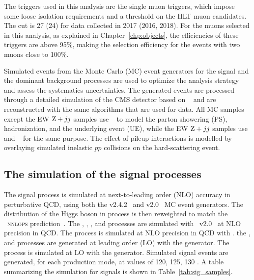 The triggers used in this analysis are the single muon triggers, which impose some loose isolation requirements and a \pt threshold on the HLT muon candidates.
The \pt cut is 27 (24) \GeV for data collected in 2017 (2016, 2018). 
For the muons selected in this analysis, as explained in Chapter~\ref{chp:objects}, the efficiencies of these triggers are above 95\%, 
making the selection efficiency for the events with two muons close to 100\%.

Simulated events from the Monte Carlo (MC) event generators for the signal and the dominant background processes are used to 
optimize the analysis strategy and assess the systematics uncertainties.
The generated events are processed through a detailed simulation of the CMS detector based on \GEANTfour~\cite{AGOSTINELLI2003250}
and are reconstructed with the same algorithms that are used for data.
All MC samples except the EW $\mathrm{Z}+jj$ samples use ~\cite{SJOSTRAND2015159} to model the parton showering (PS), 
hadronization, and the underlying event (UE), while the EW $\mathrm{Z}+jj$ samples use \HERWIGpp and \HERWIGSeven~\cite{Bellm:2015jjp} for the same purpose.
The effect of pileup interactions is modelled by overlaying simulated inelastic $pp$ collisions on the hard-scattering event.\\

\bigskip
\subsection{The simulation of the signal processes}
The \ggH signal process is simulated at next-to-leading order (NLO) accuracy in perturbative QCD, using both the \MGvATNLO v2.4.2~\cite{Alwall:2014hca}
and \POWHEG v2.0~\cite{Nason_2004, Frixione_2007, Alioli:2010xd, Bagnaschi:2011tu} MC event generators. 
The \pt distribution of the Higgs boson in \ggH process is then reweighted to match the \POWHEG~\textsc{nnlops} prediction~\cite{Hamilton:2013fea,Hamilton:2015nsa}. 
The \qqH, \WH, \qqZH, and \ttH processes are simulated with \POWHEG~v2.0~\cite{Nason:2009ai,Luisoni:2013kna,Hartanto:2015uka} at NLO precision in QCD. 
The \bbH process is simulated at NLO precision in QCD with \POWHEG.
the \tHq, and \tHW processes are generated at leading order (LO) with the \MGvATNLO generator.
The \ggZH process is simulated at LO with the \POWHEG generator.
Simulated signal events are generated, for each production mode, at \mh values of 120, 125, 130 \GeV.
A table summarizing the simulation for signals is shown in Table~\ref{tab:sig_samples}.

